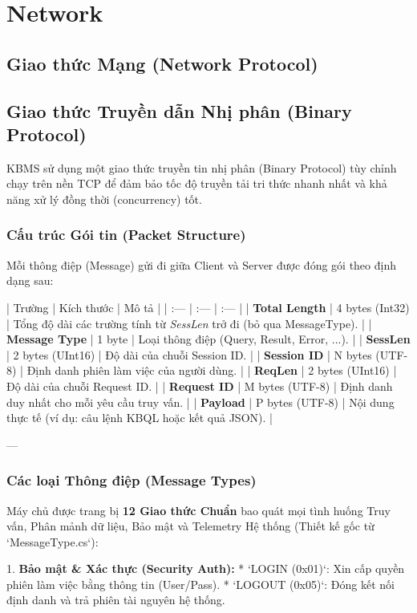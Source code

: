\chapter{Network}
\section{Giao thức Mạng (Network Protocol)}

\section{Giao thức Truyền dẫn Nhị phân (Binary Protocol)}
KBMS sử dụng một giao thức truyền tin nhị phân (Binary Protocol) tùy chỉnh chạy trên nền TCP để đảm bảo tốc độ truyền tải tri thức nhanh nhất và khả năng xử lý đồng thời (concurrency) tốt.

\subsection{Cấu trúc Gói tin (Packet Structure)}

Mỗi thông điệp (Message) gửi đi giữa Client và Server được đóng gói theo định dạng sau:

| Trường | Kích thước | Mô tả |
| :--- | :--- | :--- |
| \textbf{Total Length} | 4 bytes (Int32) | Tổng độ dài các trường tính từ \textit{SessLen} trở đi (bỏ qua MessageType). |
| \textbf{Message Type} | 1 byte | Loại thông điệp (Query, Result, Error, ...). |
| \textbf{SessLen} | 2 bytes (UInt16) | Độ dài của chuỗi Session ID. |
| \textbf{Session ID} | N bytes (UTF-8) | Định danh phiên làm việc của người dùng. |
| \textbf{ReqLen} | 2 bytes (UInt16) | Độ dài của chuỗi Request ID. |
| \textbf{Request ID} | M bytes (UTF-8) | Định danh duy nhất cho mỗi yêu cầu truy vấn. |
| \textbf{Payload} | P bytes (UTF-8) | Nội dung thực tế (ví dụ: câu lệnh KBQL hoặc kết quả JSON). |

---

\subsection{Các loại Thông điệp (Message Types)}

Máy chủ được trang bị \textbf{12 Giao thức Chuẩn} bao quát mọi tình huống Truy vấn, Phân mảnh dữ liệu, Bảo mật và Telemetry Hệ thống (Thiết kế gốc từ `MessageType.cs`):

1.  \textbf{Bảo mật \& Xác thực (Security Auth):}
    *   `LOGIN (0x01)`: Xin cấp quyền phiên làm việc bằng thông tin (User/Pass).
    *   `LOGOUT (0x05)`: Đóng kết nối định danh và trả phiên tài nguyên hệ thống.


